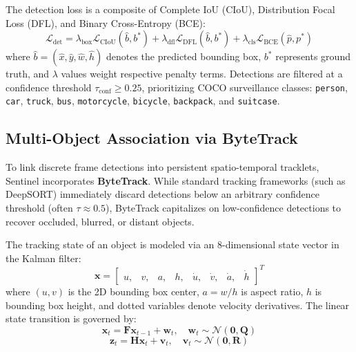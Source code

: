 \documentclass[12pt,a4paper]{article}
\begin{document}
The detection loss is a composite of Complete IoU (CIoU), Distribution Focal Loss (DFL), and Binary Cross-Entropy (BCE):
\begin{equation}
\mathcal{L}_{\text{det}} = \lambda_{\text{box}} \mathcal{L}_{\text{CIoU}}(\hat{b}, b^*) + \lambda_{\text{dfl}} \mathcal{L}_{\text{DFL}}(\hat{b}, b^*) + \lambda_{\text{cls}} \mathcal{L}_{\text{BCE}}(\hat{p}, p^*)
\end{equation}
where $\hat{b} = (\hat{x}, \hat{y}, \hat{w}, \hat{h})$ denotes the predicted bounding box, $b^*$ represents ground truth, and $\lambda$ values weight respective penalty terms. Detections are filtered at a confidence threshold $\tau_{\text{conf}} \ge 0.25$, prioritizing COCO surveillance classes: \texttt{person}, \texttt{car}, \texttt{truck}, \texttt{bus}, \texttt{motorcycle}, \texttt{bicycle}, \texttt{backpack}, and \texttt{suitcase}.

\subsection{Multi-Object Association via ByteTrack}
To link discrete frame detections into persistent spatio-temporal tracklets, Sentinel incorporates \textbf{ByteTrack}. While standard tracking frameworks (such as DeepSORT) immediately discard detections below an arbitrary confidence threshold (often $\tau \approx 0.5$), ByteTrack capitalizes on low-confidence detections to recover occluded, blurred, or distant objects.

The tracking state of an object is modeled via an 8-dimensional state vector in the Kalman filter:
\begin{equation}
\mathbf{x} = \begin{bmatrix} u, & v, & a, & h, & \dot{u}, & \dot{v}, & \dot{a}, & \dot{h} \end{bmatrix}^T
\end{equation}
where $(u, v)$ is the 2D bounding box center, $a = w/h$ is aspect ratio, $h$ is bounding box height, and dotted variables denote velocity derivatives. The linear state transition is governed by:
\begin{equation}
\mathbf{x}_t = \mathbf{F} \mathbf{x}_{t-1} + \mathbf{w}_t, \quad \mathbf{w}_t \sim \mathcal{N}(\mathbf{0}, \mathbf{Q})
\end{equation}
\begin{equation}
\mathbf{z}_t = \mathbf{H} \mathbf{x}_t + \mathbf{v}_t, \quad \mathbf{v}_t \sim \mathcal{N}(\mathbf{0}, \mathbf{R})
\end{equation}
\end{document}
